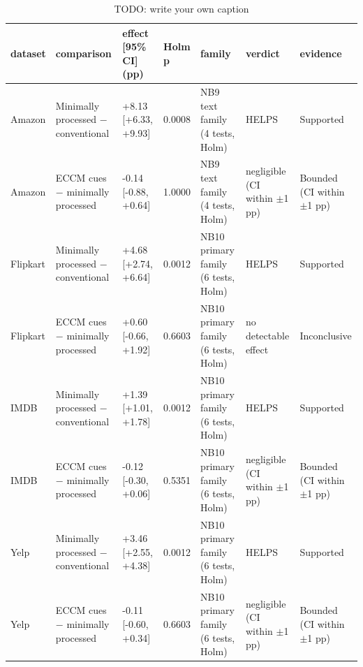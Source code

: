 \begin{table}
\caption{TODO: write your own caption}\label{tab:T02-preprocessing-tests}
\scriptsize
\begin{tabularx}{\textheight}{l>{\raggedright\arraybackslash}Xll>{\raggedright\arraybackslash}X>{\raggedright\arraybackslash}X>{\raggedright\arraybackslash}X}
\toprule
dataset & comparison & effect [95\% CI] (pp) & Holm p & family & verdict & evidence \\
\midrule
Amazon & Minimally processed $-$ conventional & +8.13 [+6.33, +9.93] & 0.0008 & NB9 text family (4 tests, Holm) & HELPS & Supported \\
Amazon & ECCM cues $-$ minimally processed & -0.14 [-0.88, +0.64] & 1.0000 & NB9 text family (4 tests, Holm) & negligible (CI within $\pm$1 pp) & Bounded (CI within $\pm$1 pp) \\
Flipkart & Minimally processed $-$ conventional & +4.68 [+2.74, +6.64] & 0.0012 & NB10 primary family (6 tests, Holm) & HELPS & Supported \\
Flipkart & ECCM cues $-$ minimally processed & +0.60 [-0.66, +1.92] & 0.6603 & NB10 primary family (6 tests, Holm) & no detectable effect & Inconclusive \\
IMDB & Minimally processed $-$ conventional & +1.39 [+1.01, +1.78] & 0.0012 & NB10 primary family (6 tests, Holm) & HELPS & Supported \\
IMDB & ECCM cues $-$ minimally processed & -0.12 [-0.30, +0.06] & 0.5351 & NB10 primary family (6 tests, Holm) & negligible (CI within $\pm$1 pp) & Bounded (CI within $\pm$1 pp) \\
Yelp & Minimally processed $-$ conventional & +3.46 [+2.55, +4.38] & 0.0012 & NB10 primary family (6 tests, Holm) & HELPS & Supported \\
Yelp & ECCM cues $-$ minimally processed & -0.11 [-0.60, +0.34] & 0.6603 & NB10 primary family (6 tests, Holm) & negligible (CI within $\pm$1 pp) & Bounded (CI within $\pm$1 pp) \\
\bottomrule
\end{tabularx}
\par{}
\end{table}
